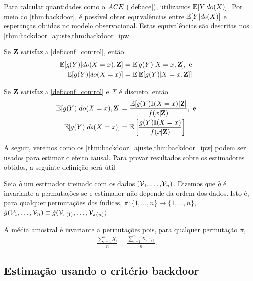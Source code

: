 Para calcular quantidades 
como o ${ACE}$ (\cref{def:ace}), 
utilizamos ${\mathbb E}[Y|do(X)]$.
Por meio do \cref{thm:backdoor},
é possível obter equivalências entre
${\mathbb E}[Y|do(X)]$ e esperanças obtidas
no modelo observacional.
Estas equivalências são descritas
nos \cref{thm:backdoor_ajuste,thm:backdoor_ipw}.

\begin{theorem}
 \label{thm:backdoor_ajuste}
 Se ${\mathbf{Z}}$ satisfaz 
 a \cref{def:conf_control}, então
 \begin{align*}
  {\mathbb E}[g(Y)|do(X=x),{\mathbf{Z}}]
  &= {\mathbb E}[g(Y)|X=x,{\mathbf{Z}}], \text{ e } \\
  {\mathbb E}[g(Y)|do(X=x)] 
  &= {\mathbb E}[{\mathbb E}[g(Y)|X=x,{\mathbf{Z}}]]
 \end{align*}
\end{theorem}

\begin{theorem}
 \label{thm:backdoor_ipw}
 Se ${\mathbf{Z}}$ satisfaz 
 a \cref{def:conf_control} e
 $X$ é discreto, então
 \begin{align*}
  {\mathbb E}[g(Y)|do(X=x),{\mathbf{Z}}] 
  &= \frac{{\mathbb E}[g(Y){\mathbb I}(X=x)|{\mathbf{Z}}]}{f(x|{\mathbf{Z}})}, \text{ e } \\
  {\mathbb E}[g(Y)|do(X=x)]
  &= {\mathbb E}\left[\frac{g(Y){\mathbb I}(X=x)}{f(x|{\mathbf{Z}})}\right]
 \end{align*}
\end{theorem}

A seguir, veremos como os
\cref{thm:backdoor_ajuste,thm:backdoor_ipw} podem
ser usados para estimar o efeito causal.
Para provar resultados sobre os estimadores obtidos,
a seguinte definição será útil

\begin{definition}
 \label{def:perm}
 Seja $\hat{g}$ um estimador treinado com
 os dados $({\mathcal V}_1,\ldots,{\mathcal V}_n)$.
 Dizemos que $\hat{g}$ é 
 invariante a permutações se
 o estimador não depende da ordem dos dados.
 Isto é, para qualquer permutações dos índices,
 $\pi: \{1,\ldots,n\} \rightarrow \{1,\ldots,n\}$,
 $\hat{g}({\mathcal V}_1,\ldots,{\mathcal V}_n) \equiv 
 \hat{g}({\mathcal V}_{\pi(1)},\ldots,{\mathcal V}_{\pi(n)})$
\end{definition}

\begin{example}
 \label{ex:perm}
 A média amostral é invariante a permutações pois,
 para qualquer permutação $\pi$,
 \begin{align*}
  \frac{\sum_{i=1}^n X_i}{n} 
  = \frac{\sum_{i=1}^n X_{\pi(i)}}{n}.
 \end{align*} 
\end{example}

\subsection{Estimação usando o critério backdoor}
\label{sec:backdoor_est}

